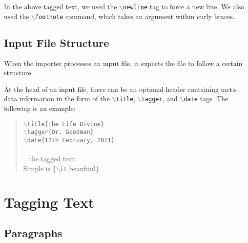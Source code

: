 \documentclass[11pt]{article}
\newcommand{\cmd}[1]{{\tt $\backslash$#1}}
\begin{document}
In the above tagged text, we used the \cmd{newline} tag to force a new
line. We also used the \cmd{footnote} command, which takes an argument
within curly braces.










\subsection{Input File Structure}

When the importer processes an input file, it expects the file to
follow a certain structure.

At the head of an input file, there can be an optional header
containing meta-data information in the form of the \cmd{title},
\cmd{tagger}, and \cmd{date} tags. The following is an example:

\begin{quote}
  \cmd{title\{The Life Divine\}}\\
  \cmd{tagger\{Dr. Goodman\}}\\
  \cmd{date\{12th February, 2011\}}\\
\\
  ...the tagged text \\
  Simple is \{\cmd{it} beaufitul\}.\\
\end{quote}


\section{Tagging Text}

\subsection{Paragraphs}
\end{document}
